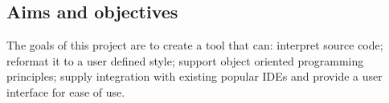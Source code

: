 \subsection{Aims and objectives}
The goals of this project are to create a tool that can: interpret source code; reformat it to a user defined style; support object oriented programming principles; supply integration with existing popular IDEs and provide a user interface for ease of use.
